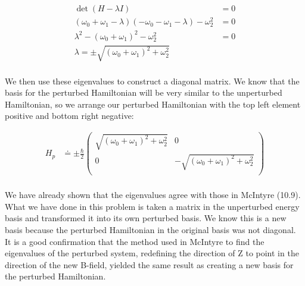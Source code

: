 \documentclass[10pt]{article} %
\begin{document}
\begin{align*}
  \det\left(H - \lambda I\right) &= 0\\
  \left(\omega_0 + \omega_1 - \lambda\right)
  \left(-\omega_0 - \omega_1 - \lambda\right) - \omega_2^2 &= 0\\
  \lambda^2 - \left(\omega_0 + \omega_1\right)^2 - \omega_2^2 &= 0\\
  \lambda = \pm\sqrt{\left(\omega_0 + \omega_1\right)^2 + \omega_2^2}\\
\end{align*}

We then use these eigenvalues to construct a diagonal matrix. We know that the basis for the
perturbed Hamiltonian will be very similar to the unperturbed Hamiltonian, so we arrange our
perturbed Hamiltonian with the top left element positive and bottom right negative:

\begin{align*}
  H_p &\doteq
  \pm\frac{\hbar}{2}
  \begin{pmatrix}
    \sqrt{\left(\omega_0 + \omega_1\right)^2 + \omega_2^2} & 0\\
    0 & -\sqrt{\left(\omega_0 + \omega_1\right)^2 + \omega_2^2}\\
  \end{pmatrix}\\
\end{align*}

We have already shown that the eigenvalues agree with those in McIntyre (10.9). What we have done in
this problem is taken a matrix in the unperturbed energy basis and transformed it into its own
perturbed basis. We know this is a new basis because the perturbed Hamiltonian in the original
basis was not diagonal.\\

It is a good confirmation that the method used in McIntyre to find the eigenvalues of the perturbed
system, redefining the direction of Z to point in the direction of the new B-field, yielded the same
result as creating a new basis for the perturbed Hamiltonian.\\
\end{document}
